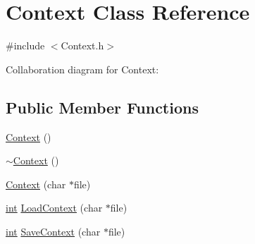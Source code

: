 \hypertarget{class_context}{\section{Context Class Reference}
\label{class_context}
}


{\ttfamily \#include $<$Context.\-h$>$}



Collaboration diagram for Context\-:
\subsection*{Public Member Functions}
\begin{DoxyCompactItemize}
\item 
\hyperlink{class_context_a652cdcd2eedc8dbd9110bd284c5d5cf0}{Context} ()
\item 
\hyperlink{class_context_a2d34e4556448e40693f61d15e091b604}{$\sim$\-Context} ()
\item 
\hyperlink{class_context_a7437ea7c9e8b861299496dc30e8f43ca}{Context} (char $\ast$file)
\item 
\hyperlink{_s_d_l__thread_8h_a6a64f9be4433e4de6e2f2f548cf3c08e}{int} \hyperlink{class_context_adca68bf949e1fa90367e5579d87a5c8e}{Load\-Context} (char $\ast$file)
\item 
\hyperlink{_s_d_l__thread_8h_a6a64f9be4433e4de6e2f2f548cf3c08e}{int} \hyperlink{class_context_a35b95fa85c6d81056ffb26f041481e17}{Save\-Context} (char $\ast$file)
\end{DoxyCompactItemize}
